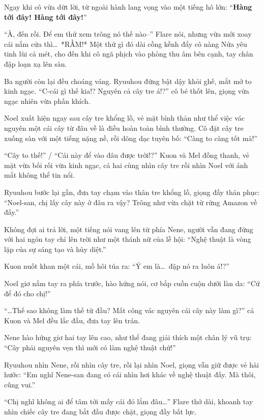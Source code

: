 \documentclass[../main.tex]{subfiles}
\begin{document}
Ngay khi cô vừa dứt lời, từ ngoài hành lang vọng vào một tiếng hô lớn: ``\textbf{Hàng tới đây! Hàng tới đây!}''

``À, đến rồi. Để em thử xem trông nó thế nào--'' Flare nói, nhưng vừa mới xoay cái nắm cửa thì\dots\ *RẦM!* Một thứ gì đó dài cồng kềnh đẩy cô nàng Nửa yêu tinh lùi cả mét, cho đến khi cô ngã phịch vào phòng thu âm bên cạnh, tay chân đập loạn xạ lên sàn.


Ba người còn lại đều choáng váng. Ryuuhou đứng bật dậy khỏi ghế, mắt mở to kinh ngạc. ``C-cái gì thế kia!? Nguyên cả cây tre á!?'' cô bé thốt lên, giọng vừa ngạc nhiên vừa phấn khích.

Noel xuất hiện ngay sau cây tre khổng lồ, vẻ mặt bình thản như thể việc vác nguyên một cái cây từ đâu về là điều hoàn toàn bình thường. Cô đặt cây tre xuống sàn với một tiếng nặng nề, rồi dõng dạc tuyên bố: ``Càng to càng tốt mà!''

``Cây to thế!'' / ``Cái này để vào đâu được trời!?'' Kuon và Mel đồng thanh, vẻ mặt vừa bối rối vừa kinh ngạc, cả hai cùng nhìn cây tre rồi nhìn Noel với ánh mắt không thể tin nổi.

Ryuuhou bước lại gần, đưa tay chạm vào thân tre khổng lồ, giọng đầy thán phục: ``Noel-san, chị lấy cây này ở đâu ra vậy? Trông như vừa chặt từ rừng Amazon về đấy.''

Không đợi ai trả lời, một tiếng nói vang lên từ phía Nene, người vẫn đang đứng với hai ngón tay chỉ lên trời như một thánh nữ của lễ hội: ``Nghệ thuật là vòng lặp của sự sáng tạo và hủy diệt.''

Kuon nuốt khan một cái, mồ hôi túa ra: ``Ý em là\dots\ đập nó ra luôn á!?''

Noel giơ nắm tay ra phía trước, hào hứng nói, cơ bắp cuồn cuộn dưới làn da: ``Cứ để đó cho chị!''

``\dots Thế sao không làm thế từ đầu? Mất công vác nguyên cái cây này làm gì?'' cả Kuon và Mel đều lắc đầu, đưa tay lên trán.

Nene hào hứng giơ hai tay lên cao, như thể đang giải thích một chân lý vũ trụ: ``Cây phải nguyên vẹn thì mới có làm nghệ thuật chứ!''

Ryuuhou nhìn Nene, rồi nhìn cây tre, rồi lại nhìn Noel, giọng vẫn giữ được vẻ hài hước: ``Em nghĩ Nene-san đang có cái nhìn hơi khác về nghệ thuật đấy. Mà thôi, cũng vui.''

``Chị nghĩ không ai để tâm tới mấy cái đó lắm đâu\dots'' Flare thở dài, khoanh tay nhìn chiếc cây tre đang bắt đầu được chặt, giọng đầy bất lực.
\end{document}
